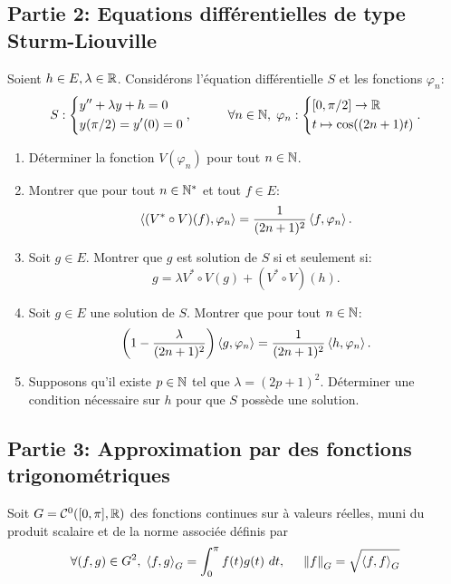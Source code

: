 \subsection*{Partie 2: Equations différentielles de type Sturm-Liouville}
Soient $h\in E, \lambda \in \mathbb{R}$. Considérons l'équation différentielle $S$ et les fonctions $\varphi_n$:
\begin{displaymath}
S: \left \{
\begin{aligned}
&y''+\lambda y + h = 0\\ &y(\pi /2) = y'(0) = 0  
\end{aligned}
\right., \hspace{1cm}
\forall n \in \mathbb{N}, \;\varphi_{n}: 
\left\lbrace 
\begin{aligned}
&[0,\pi /2] \rightarrow \mathbb{R} \\  &t \mapsto \cos((2n+1)t) 
\end{aligned}
\right. .
\end{displaymath}

\begin{enumerate}
\item Déterminer la fonction $V(\varphi_{n})$ pour tout $n\in \mathbb{N}$. 

\item Montrer que pour tout $n\in \mathbb{N}^{*}$ et tout $f\in E$:
$$\left\langle {(V^{*}\circ V)(f)} , {\varphi_{n}} \right\rangle = \frac{1}{(2n+1)^{2}}\left\langle {f} , {\varphi_{n}} \right\rangle.$$

\item Soit $g\in E$. Montrer que $g$ est solution de $S$ si et seulement si:
$$g = \lambda V^{*}\circ V(g) + (V^{*}\circ V)(h).$$

\item Soit $g\in E$ une solution de $S$. Montrer que pour tout $n\in \mathbb{N}$:
$$\left ( 1-\frac{\lambda}{(2n+1)^{2}} \right )\left\langle {g} , {\varphi_{n}} \right\rangle = \frac{1}{(2n+1)^{2}}\left\langle {h} , {\varphi_{n}} \right\rangle.$$

\item Supposons qu'il existe $p\in \mathbb{N}$ tel que $\lambda  = (2p+1)^{2}$. Déterminer une condition nécessaire sur $h$ pour que $S$ possède une solution.
\end{enumerate}
  
\subsection*{Partie 3:  Approximation par des fonctions trigonométriques}
Soit $G = \mathcal{C}^{0}([0,\pi],\mathbb{R})$ des fonctions continues sur  à valeurs réelles, muni du produit scalaire et de la norme associée définis par
\begin{displaymath}
\forall (f,g)\in G^{2},\; \left\langle {f} , {g} \right\rangle_{G} = \int_{0}^{\pi}f(t)g(t)\ dt, \hspace{0.5cm}  \left\Vert f\right\Vert_{G} = \sqrt{\left\langle {f} , {f} \right\rangle_{G}}
\end{displaymath}

